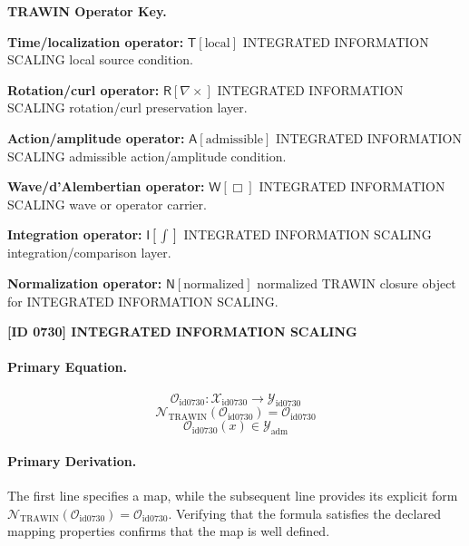 \par\vspace{0.45\baselineskip}
\noindent\begin{minipage}[t]{\linewidth}
\begingroup
\small
\raggedright
\textbf{TRAWIN Operator Key.}\par
\noindent\textbf{Time/localization operator:} $\mathsf{T}\!\left[\mathrm{local}\right]$ INTEGRATED INFORMATION SCALING local source condition.\par
\noindent\textbf{Rotation/curl operator:} $\mathsf{R}\!\left[\nabla\times\right]$ INTEGRATED INFORMATION SCALING rotation/curl preservation layer.\par
\noindent\textbf{Action/amplitude operator:} $\mathsf{A}\!\left[\mathrm{admissible}\right]$ INTEGRATED INFORMATION SCALING admissible action/amplitude condition.\par
\noindent\textbf{Wave/d'Alembertian operator:} $\mathsf{W}\!\left[\Box\right]$ INTEGRATED INFORMATION SCALING wave or operator carrier.\par
\noindent\textbf{Integration operator:} $\mathsf{I}\!\left[\int\right]$ INTEGRATED INFORMATION SCALING integration/comparison layer.\par
\noindent\textbf{Normalization operator:} $\mathsf{N}\!\left[\mathrm{normalized}\right]$ normalized TRAWIN closure object for INTEGRATED INFORMATION SCALING.\par
\endgroup
\end{minipage}

\clearpage
\noindent\textbf{[ID 0730] INTEGRATED INFORMATION SCALING}\par
\vspace{0.35em}
\paragraph{Primary Equation.}
\[
\mathcal{O}_{\mathrm{id0730}}:\mathcal{X}_{\mathrm{id0730}}\longrightarrow\mathcal{Y}_{\mathrm{id0730}}
\]
\[
\mathcal{N}_{\mathrm{TRAWIN}}(\mathcal{O}_{\mathrm{id0730}})=\mathcal{O}_{\mathrm{id0730}}
\]
\[
\mathcal{O}_{\mathrm{id0730}}(x)\in\mathcal{Y}_{\mathrm{adm}}
\]

\paragraph{Primary Derivation.}
The first line specifies a map, while the subsequent line provides its explicit form \( \mathcal{N}_{\mathrm{TRAWIN}}(\mathcal{O}_{\mathrm{id0730}})=\mathcal{O}_{\mathrm{id0730}} \). Verifying that the formula satisfies the declared mapping properties confirms that the map is well defined.
